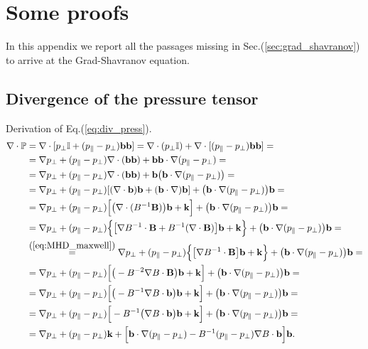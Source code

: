 \chapter{Some proofs}\label{ch:appx}
In this appendix we report all the passages missing in Sec.(\ref{sec:grad_shavranov}) to arrive at the Grad-Shavranov equation.

\section{Divergence of the pressure tensor}
Derivation of Eq.(\ref{eq:div_press}).
\begin{equation*}
  \begin{split}
    \nabla\cdot\mathbb{P}&=\nabla\cdot[p_\perp \mathbb{I} + ( p_\parallel - p_\perp ) \mathbf{b}\mathbf{b}]=
    \nabla\cdot(p_\perp \mathbb{I}) + \nabla\cdot[( p_\parallel - p_\perp ) \mathbf{b}\mathbf{b}]=\\
    &=\nabla p_\perp+(p_\parallel-p_\perp)\nabla\cdot(\mathbf{b}\mathbf{b})+\mathbf{b}\mathbf{b}\cdot\nabla(p_\parallel-p_\perp)=\\
    &=\nabla p_\perp+(p_\parallel-p_\perp)\nabla\cdot(\mathbf{b}\mathbf{b})+\mathbf{b}\big(\mathbf{b}\cdot\nabla(p_\parallel-p_\perp)\big)=\\
    &=\nabla p_\perp+(p_\parallel-p_\perp)[(\nabla\cdot\mathbf{b})\mathbf{b}+(\mathbf{b}\cdot\nabla)\mathbf{b}]+\big(\mathbf{b}\cdot\nabla(p_\parallel-p_\perp)\big)\mathbf{b}=\\
    &=\nabla p_\perp+(p_\parallel-p_\perp)\Big[\big(\nabla\cdot(B^{-1}\mathbf{B})\big)\mathbf{b}+\mathbf{k}\Big]+\big(\mathbf{b}\cdot\nabla(p_\parallel-p_\perp)\big)\mathbf{b}=\\
    &=\nabla p_\perp+(p_\parallel-p_\perp)\Big\{\big[\nabla B^{-1}\cdot\mathbf{B}+B^{-1}(\nabla\cdot\mathbf{B})\big]\mathbf{b}+\mathbf{k}\Big\}+\big(\mathbf{b}\cdot\nabla(p_\parallel-p_\perp)\big)\mathbf{b}=\\
    &\overset{\mbox{(\ref{eq:MHD_maxwell})}}{=}\nabla p_\perp+(p_\parallel-p_\perp)\Big\{\big[\nabla B^{-1}\cdot\mathbf{B}\big]\mathbf{b}+\mathbf{k}\Big\}+\big(\mathbf{b}\cdot\nabla(p_\parallel-p_\perp)\big)\mathbf{b}=\\
    &=\nabla p_\perp+(p_\parallel-p_\perp)\Big[\big( -B^{-2}\nabla B\cdot\mathbf{B}\big)\mathbf{b}+\mathbf{k}\Big]+\big(\mathbf{b}\cdot\nabla(p_\parallel-p_\perp)\big)\mathbf{b}=\\
    &=\nabla p_\perp+(p_\parallel-p_\perp)\Big[\big( -B^{-1}\nabla B\cdot\mathbf{b}\big)\mathbf{b}+\mathbf{k}\Big]+\big(\mathbf{b}\cdot\nabla(p_\parallel-p_\perp)\big)\mathbf{b}=\\
    &=\nabla p_\perp+(p_\parallel-p_\perp)\Big[ -B^{-1}\big(\nabla B\cdot\mathbf{b}\big)\mathbf{b}+\mathbf{k}\Big]+\big(\mathbf{b}\cdot\nabla(p_\parallel-p_\perp)\big)\mathbf{b}=\\
    &=\nabla p_\perp+(p_\parallel-p_\perp)\mathbf{k}+\Big[\mathbf{b}\cdot\nabla(p_\parallel-p_\perp)-B^{-1}(p_\parallel-p_\perp)\nabla B\cdot\mathbf{b}\Big]\mathbf{b}.
 \end{split}
\end{equation*}

